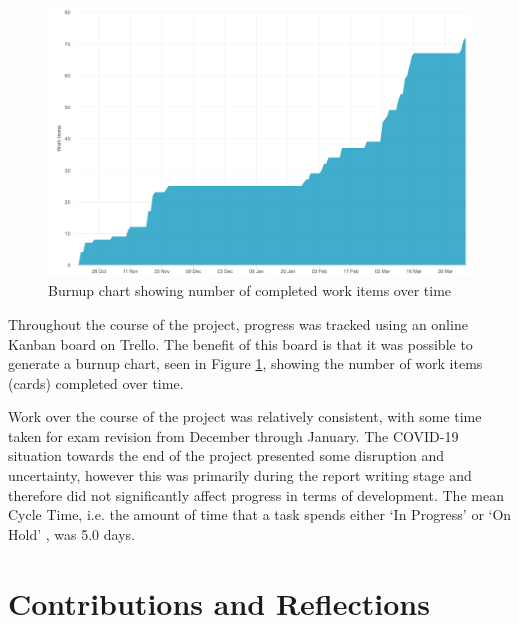 
\begin{figure}[h!]
  \centering
  \includegraphics[width=\textwidth]{images/burnup.png}
  \caption{Burnup chart showing number of completed work items over time}
  \label{fig:burnup}
\end{figure}

Throughout the course of the project, progress was tracked using an online Kanban board on Trello. The benefit of this board is that it was possible to generate a burnup chart, seen in Figure \ref{fig:burnup}, showing the number of work items (cards) completed over time.

Work over the course of the project was relatively consistent, with some time taken for exam revision from December through January. The COVID-19 situation towards the end of the project presented some disruption and uncertainty, however this was primarily during the report writing stage and therefore did not significantly affect progress in terms of development. The mean Cycle Time, i.e. the amount of time that a task spends either `In Progress' or `On Hold' \cite{roock2010kanban}, was 5.0 days.

\section{Contributions and Reflections}


